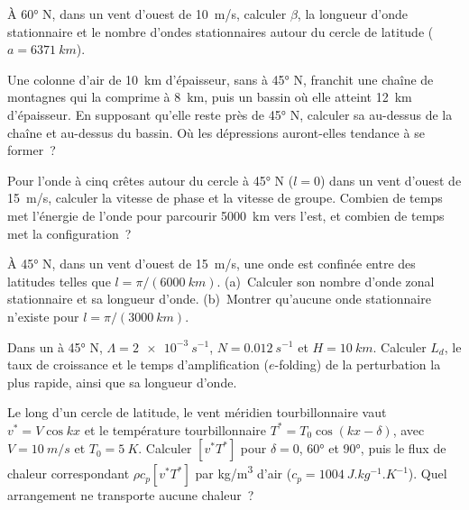 \begin{exercise}[$\star$]\label{exo:b3:atmospheric-dynamics:4}
À \ang{60} N, dans un vent d'ouest de \qty{10}{m/s}, calculer $\beta$, la
longueur d'onde stationnaire et le nombre d'ondes stationnaires autour du
cercle de latitude ($a = \qty{6371}{km}$).
\end{exercise}

\begin{exercise}[$\star\star$]\label{exo:b3:atmospheric-dynamics:5}
Une colonne d'air de \qty{10}{km} d'épaisseur, sans  à \ang{45}
N, franchit une chaîne de montagnes qui la comprime à \qty{8}{km}, puis un bassin
où elle atteint \qty{12}{km} d'épaisseur. En supposant qu'elle reste près de \ang{45} N, calculer sa
 au-dessus de la chaîne et au-dessus du bassin. Où les
dépressions auront-elles tendance à se former~?
\end{exercise}

\begin{exercise}[$\star\star$]\label{exo:b3:atmospheric-dynamics:6}
Pour l'onde à cinq crêtes autour du cercle à \ang{45} N ($l = 0$) dans un
vent d'ouest de \qty{15}{m/s}, calculer la vitesse de phase et la vitesse de groupe.
Combien de temps met l'énergie de l'onde pour parcourir \qty{5000}{km} vers l'est, et
combien de temps met la configuration~?
\end{exercise}

\begin{exercise}[$\star\star$]\label{exo:b3:atmospheric-dynamics:7}
À \ang{45} N, dans un vent d'ouest de \qty{15}{m/s}, une onde est confinée entre
des latitudes telles que $l = \pi/(\qty{6000}{km})$. (a)~Calculer son nombre d'onde
zonal stationnaire et sa longueur d'onde. (b)~Montrer qu'aucune onde stationnaire
n'existe pour $l = \pi/(\qty{3000}{km})$.
\end{exercise}

\begin{exercise}[$\star\star$]\label{exo:b3:atmospheric-dynamics:8}
Dans un  à \ang{45} N, $\Lambda = \qty{2e-3}{s^{-1}}$, $N =
\qty{0.012}{s^{-1}}$ et $H = \qty{10}{km}$. Calculer $L_d$, le taux de croissance et
le temps d'amplification ($e$-folding) de la perturbation la plus rapide, ainsi que
sa longueur d'onde.
\end{exercise}

\begin{exercise}[$\star\star$]\label{exo:b3:atmospheric-dynamics:9}
Le long d'un cercle de latitude, le vent méridien tourbillonnaire vaut $v^* = V\cos kx$ et le
température tourbillonnaire $T^* = T_0\cos(kx - \delta)$, avec $V = \qty{10}{m/s}$ et
$T_0 = \qty{5}{K}$. Calculer $[v^*T^*]$ pour $\delta = 0$, \ang{60} et
\ang{90}, puis le flux de chaleur correspondant $\rho c_p[v^*T^*]$ par
\unit{kg/m^3} d'air ($c_p = \qty{1004}{J.kg^{-1}.K^{-1}}$). Quel
arrangement ne transporte aucune chaleur~?
\end{exercise}

